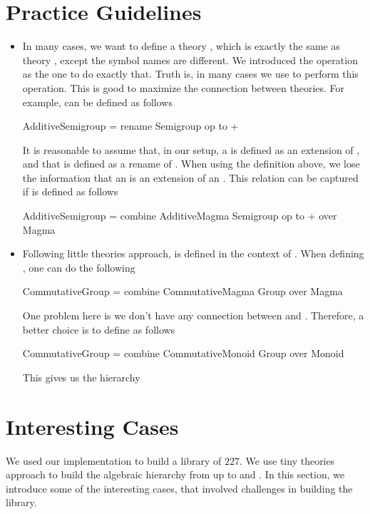 \section{Practice Guidelines}
\begin{itemize}
    \item In many cases, we want to define a theory , which is exactly the same as theory , except the symbol names are different. We introduced the  operation as the one to do exactly that. Truth is, in many cases we use  to perform this operation. This is good to maximize the connection between theories. For example,   can be defined as follows
\begin{togcode}
AdditiveSemigroup = rename Semigroup {op to +}
\end{togcode}
     It is reasonable to assume that, in our setup, a  is defined as an extension of , and that  is defined as a rename of . When using the definition above, we lose the information that an  is an extension of an . This relation can be captured if  is defined as follows 
\begin{togcode}
AdditiveSemigroup = 
  combine AdditiveMagma {} Semigroup {op to +} over Magma 
\end{togcode}

    \item Following little theories approach,  is defined in the context of . When defining , one can do the following 
\begin{togcode}
CommutativeGroup = 
  combine CommutativeMagma {} Group {} over Magma
\end{togcode}
    One problem here is we don't have any connection between  and . Therefore, a better choice is to define  as follows 
\begin{togcode}
CommutativeGroup = 
  combine CommutativeMonoid {} Group {} over Monoid
\end{togcode}
This gives us the hierarchy 
\end{itemize}


\section{Interesting Cases}
\label{sec:interesting_cases}
We used our implementation to build a library of $227$. We use tiny theories approach to build the algebraic hierarchy from  up to  and  . In this section, we introduce some of the interesting cases, that involved challenges in building the library. 

